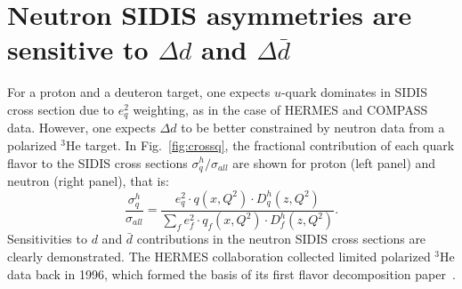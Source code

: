 \section{Neutron SIDIS asymmetries are sensitive to $\Delta d$ and $\Delta \bar{d}$}
For a proton and a deuteron target, one expects $u$-quark dominates in SIDIS cross section 
due to $e_q^2$ weighting, as in the case of HERMES and COMPASS data. However,  
one expects $\Delta d$ to be better constrained by neutron data from a polarized $^3$He target.
In Fig.~\ref{fig:crossq}, the fractional contribution of each quark flavor 
to the SIDIS cross sections $\sigma_q^h/\sigma_{all}$ are shown for proton (left panel) and neutron (right panel),
 that is:
\begin{equation}
{\frac{\sigma_q^h}{\sigma_{all}}}= {\frac{e_q^2 \cdot q(x,Q^2) \cdot D_q^h(z,Q^2)} {\sum_f e_f^2 \cdot  q_f(x,Q^2)\cdot D_f^h(z,Q^2)}}.
\end{equation} 
Sensitivities to $d$ and $\bar{d}$ contributions in the neutron SIDIS cross sections are clearly demonstrated.
 The HERMES collaboration collected limited polarized $^3$He data back
in 1996, which formed the basis of its first flavor decomposition paper~\cite{hermes99}.   
